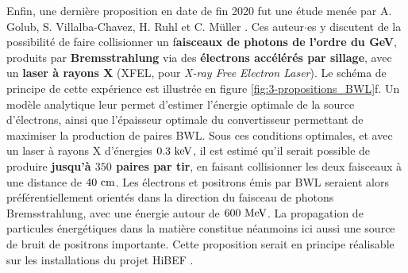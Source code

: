 \begin{refsection}
Enfin, une dernière proposition en date de fin 2020 fut une étude menée par A. Golub, S. Villalba-Chavez, H. Ruhl et C. Müller \parencite{golub_2020}. Ces auteur$\cdot$es y discutent de la possibilité de faire collisionner un f\textbf{aisceaux de photons de l'ordre du GeV}, produits par \textbf{Bremsstrahlung} via des \textbf{électrons accélérés par sillage}, avec un \textbf{laser à rayons X} (XFEL, pour \textit{X-ray Free Electron Laser}). Le schéma de principe de cette expérience est illustrée en figure \ref{fig:3-propositions_BWL}f. Un modèle analytique leur permet d'estimer l'énergie optimale de la source d'électrons, ainsi que l'épaisseur optimale du convertisseur permettant de maximiser la production de paires BWL. Sous ces conditions optimales, et avec un laser à rayons X d'énergies $0.3 ~ \rm keV$, il est estimé qu'il serait possible de produire \textbf{jusqu'à $350$ paires par tir}, en faisant collisionner les deux faisceaux à une distance de $40 ~ \rm cm$. Les électrons et positrons émis par BWL seraient alors préférentiellement orientés dans la direction du faisceau de photons Bremsstrahlung, avec une énergie autour de $600 ~ \rm MeV$. La propagation de particules énergétiques dans la matière constitue néanmoins ici aussi une source de bruit de positrons importante. Cette proposition serait en principe réalisable sur les installations du projet HiBEF \parencite{hibef}.


\end{refsection}
